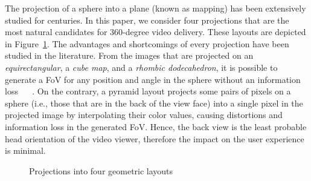 The projection of a sphere into a plane (known as mapping) has been extensively studied
for centuries. In this paper, we consider four projections that are the most natural
candidates for 360-degree video delivery. These layouts are depicted in Figure~\ref{fig:mapping}. The advantages and shortcomings of every projection have been studied in the literature. From
the images that are
projected on an \textit{equirectangular}, a \textit{cube map}, and a \textit{rhombic dodecahedron}, it is possible
to generate a \ac{FoV}
for any position and angle in the sphere without an information loss ~\cite{Ng2005} ~\cite{fu_rhombic_2009}. On the
contrary, a pyramid layout projects some pairs of pixels on a sphere (i.e., those that are in the back of the view face) into a single pixel in the projected image by interpolating their color values, causing distortions and information loss in the generated FoV. Hence, the back view is the least probable head orientation of the video viewer, therefore the impact on the user experience is minimal.

\begin{figure}[t]
\centering
{}
\caption{Projections into four geometric layouts}\label{fig:mapping}
\end{figure}

